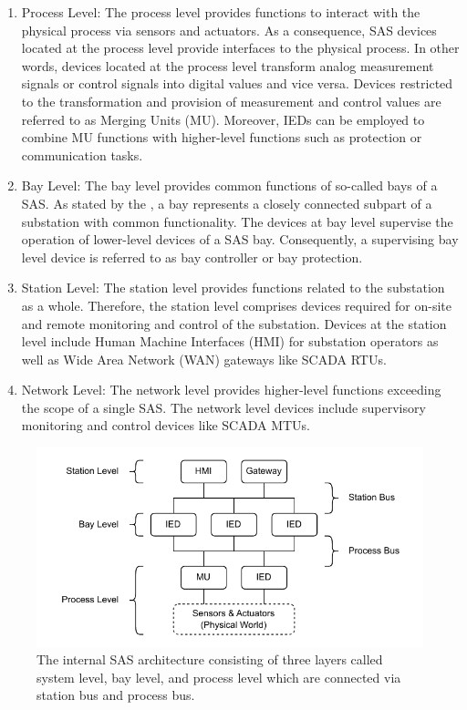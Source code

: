 \begin{enumerate}
    \item Process Level: The process level provides functions to interact with the physical process via sensors and actuators.
    As a consequence, SAS devices located at the process level provide interfaces to the physical process.
    In other words, devices located at the process level transform analog measurement signals or control signals into digital values and vice versa.
    Devices restricted to the transformation and provision of measurement and control values are referred to as Merging Units (MU).
    Moreover, IEDs can be employed to combine MU functions with higher-level functions such as protection or communication tasks.

    \item Bay Level: The bay level provides common functions of so-called bays of a SAS.
    As stated by the \citeauthor{IEC61850P5} \cite{IEC61850P5}, a bay represents a closely connected subpart of a substation with common functionality.
    The devices at bay level supervise the operation of lower-level devices of a SAS bay.
    Consequently, a supervising bay level device is referred to as bay controller or bay protection.

    \item Station Level: The station level provides functions related to the substation as a whole.
    Therefore, the station level comprises devices required for on-site and remote monitoring and control of the substation.
    Devices at the station level include Human Machine Interfaces (HMI) for substation operators as well as Wide Area Network (WAN) gateways like SCADA RTUs.

    \item Network Level: The network level provides higher-level functions exceeding the scope of a single SAS.
    The network level devices include supervisory monitoring and control devices like SCADA MTUs.
\end{enumerate}
\begin{figure}
	\centering
	\includegraphics[width=1.0\linewidth]{figures/substation_architecture.drawio.pdf}
	\caption{The internal SAS architecture consisting of three layers called system level, bay level, and process level which are connected via station bus and process bus.}
	\label{fig:substation_architecture}
\end{figure}

